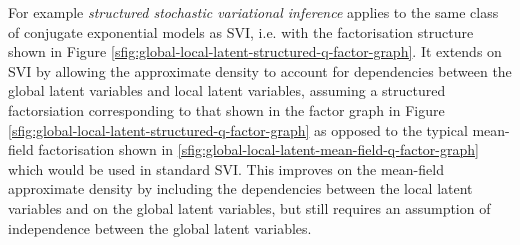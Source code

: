 For example \emph{structured stochastic variational inference} \citep{hoffman2015structured} applies to the same class of conjugate exponential models as \ac{SVI}, i.e. with the factorisation structure shown in Figure \ref{sfig:global-local-latent-structured-q-factor-graph}. It extends on \ac{SVI} by allowing the approximate density to account for dependencies between the global latent variables and local latent variables, assuming a structured factorsiation corresponding to that shown in the factor graph in Figure \ref{sfig:global-local-latent-structured-q-factor-graph} as opposed to the typical mean-field factorisation shown in \ref{sfig:global-local-latent-mean-field-q-factor-graph} which would be used in standard \ac{SVI}. This improves on the mean-field approximate density by including the dependencies between the local latent variables and on the global latent variables, but still requires an assumption of independence between the global latent variables.


